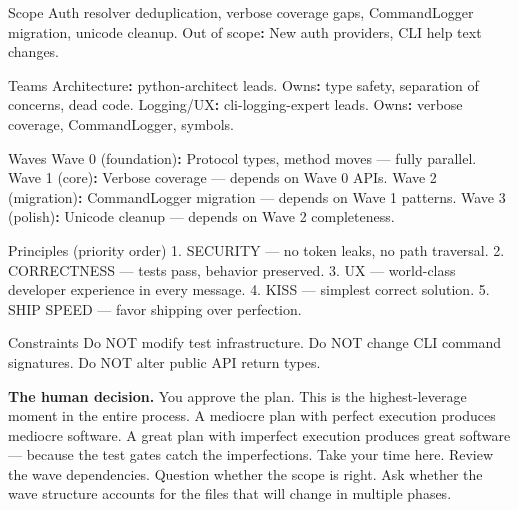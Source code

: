 \documentclass[
  a4paper,
  DIV=11,
  numbers=noendperiod]{scrreprt}
\newenvironment{Shaded}{\begin{snugshade}}{\end{snugshade}}
\newcommand{\AttributeTok}[1]{\textcolor[rgb]{0.40,0.45,0.13}{#1}}
\newcommand{\FunctionTok}[1]{\textcolor[rgb]{0.28,0.35,0.67}{#1}}
\newcommand{\KeywordTok}[1]{\textcolor[rgb]{0.00,0.23,0.31}{\textbf{#1}}}
\begin{document}
\begin{Shaded}
\begin{Highlighting}[]
\AttributeTok{Scope}
\AttributeTok{  Auth resolver deduplication, verbose coverage gaps,}
\AttributeTok{  CommandLogger migration, unicode cleanup.}
\AttributeTok{  }\FunctionTok{Out of scope}\KeywordTok{:}\AttributeTok{ New auth providers, CLI help text changes.}

\AttributeTok{Teams}
\AttributeTok{  }\FunctionTok{Architecture}\KeywordTok{:}\AttributeTok{ python{-}architect leads.}
\AttributeTok{    }\FunctionTok{Owns}\KeywordTok{:}\AttributeTok{ type safety, separation of concerns, dead code.}
\AttributeTok{  }\FunctionTok{Logging/UX}\KeywordTok{:}\AttributeTok{ cli{-}logging{-}expert leads.}
\AttributeTok{    }\FunctionTok{Owns}\KeywordTok{:}\AttributeTok{ verbose coverage, CommandLogger, symbols.}

\AttributeTok{Waves}
\AttributeTok{  }\FunctionTok{Wave 0 (foundation)}\KeywordTok{:}\AttributeTok{ Protocol types, method moves — fully parallel.}
\AttributeTok{  }\FunctionTok{Wave 1 (core)}\KeywordTok{:}\AttributeTok{ Verbose coverage — depends on Wave 0 APIs.}
\AttributeTok{  }\FunctionTok{Wave 2 (migration)}\KeywordTok{:}\AttributeTok{ CommandLogger migration — depends on Wave 1 patterns.}
\AttributeTok{  }\FunctionTok{Wave 3 (polish)}\KeywordTok{:}\AttributeTok{ Unicode cleanup — depends on Wave 2 completeness.}

\AttributeTok{Principles (priority order)}
\AttributeTok{  1. SECURITY — no token leaks, no path traversal.}
\AttributeTok{  2. CORRECTNESS — tests pass, behavior preserved.}
\AttributeTok{  3. UX — world{-}class developer experience in every message.}
\AttributeTok{  4. KISS — simplest correct solution.}
\AttributeTok{  5. SHIP SPEED — favor shipping over perfection.}

\AttributeTok{Constraints}
\AttributeTok{  Do NOT modify test infrastructure.}
\AttributeTok{  Do NOT change CLI command signatures.}
\AttributeTok{  Do NOT alter public API return types.}
\end{Highlighting}
\end{Shaded}

\textbf{The human decision.} You approve the plan. This is the
highest-leverage moment in the entire process. A mediocre plan with
perfect execution produces mediocre software. A great plan with
imperfect execution produces great software --- because the test gates
catch the imperfections. Take your time here. Review the wave
dependencies. Question whether the scope is right. Ask whether the wave
structure accounts for the files that will change in multiple phases.
\end{document}
